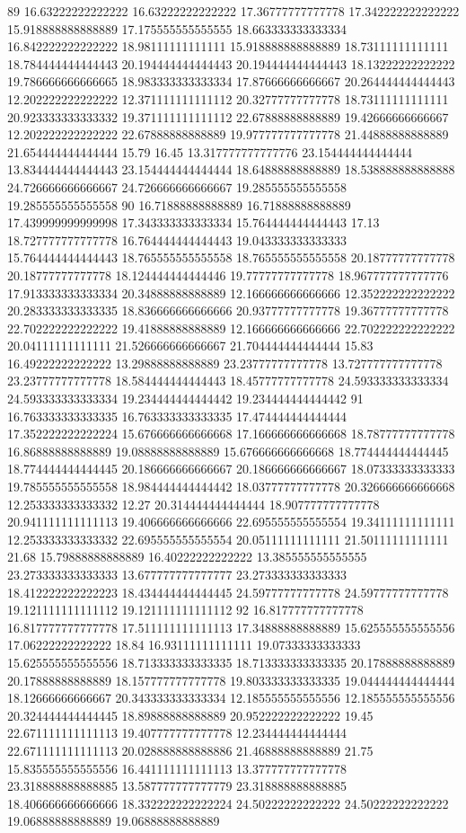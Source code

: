 89 16.63222222222222 16.63222222222222 17.36777777777778 17.342222222222222 15.918888888888889 17.175555555555555 18.663333333333334 16.842222222222222 18.98111111111111 15.918888888888889 18.73111111111111 18.784444444444443 20.194444444444443 20.194444444444443 18.13222222222222 19.786666666666665 18.983333333333334 17.87666666666667 20.264444444444443 12.202222222222222 12.371111111111112 20.32777777777778 18.73111111111111 20.923333333333332 19.371111111111112 22.67888888888889 19.42666666666667 12.202222222222222 22.67888888888889 19.977777777777778 21.44888888888889 21.654444444444444 15.79 16.45 13.317777777777776 23.154444444444444 13.834444444444443 23.154444444444444 18.64888888888889 18.538888888888888 24.726666666666667 24.726666666666667 19.285555555555558 19.285555555555558
90 16.71888888888889 16.71888888888889 17.439999999999998 17.343333333333334 15.764444444444443 17.13 18.727777777777778 16.764444444444443 19.043333333333333 15.764444444444443 18.765555555555558 18.765555555555558 20.18777777777778 20.18777777777778 18.124444444444446 19.77777777777778 18.967777777777776 17.913333333333334 20.34888888888889 12.166666666666666 12.352222222222222 20.283333333333335 18.836666666666666 20.93777777777778 19.36777777777778 22.702222222222222 19.41888888888889 12.166666666666666 22.702222222222222 20.04111111111111 21.526666666666667 21.704444444444444 15.83 16.49222222222222 13.29888888888889 23.23777777777778 13.727777777777778 23.23777777777778 18.584444444444443 18.45777777777778 24.593333333333334 24.593333333333334 19.234444444444442 19.234444444444442
91 16.763333333333335 16.763333333333335 17.474444444444444 17.352222222222224 15.676666666666668 17.166666666666668 18.78777777777778 16.86888888888889 19.08888888888889 15.676666666666668 18.774444444444445 18.774444444444445 20.186666666666667 20.186666666666667 18.07333333333333 19.785555555555558 18.984444444444442 18.03777777777778 20.326666666666668 12.253333333333332 12.27 20.314444444444444 18.907777777777778 20.941111111111113 19.406666666666666 22.695555555555554 19.34111111111111 12.253333333333332 22.695555555555554 20.05111111111111 21.50111111111111 21.68 15.79888888888889 16.40222222222222 13.385555555555555 23.273333333333333 13.677777777777777 23.273333333333333 18.412222222222223 18.434444444444445 24.59777777777778 24.59777777777778 19.121111111111112 19.121111111111112
92 16.817777777777778 16.817777777777778 17.511111111111113 17.34888888888889 15.625555555555556 17.06222222222222 18.84 16.93111111111111 19.07333333333333 15.625555555555556 18.713333333333335 18.713333333333335 20.17888888888889 20.17888888888889 18.157777777777778 19.803333333333335 19.044444444444444 18.12666666666667 20.343333333333334 12.185555555555556 12.185555555555556 20.324444444444445 18.89888888888889 20.952222222222222 19.45 22.671111111111113 19.407777777777778 12.234444444444444 22.671111111111113 20.028888888888886 21.46888888888889 21.75 15.835555555555556 16.441111111111113 13.377777777777778 23.318888888888885 13.587777777777779 23.318888888888885 18.406666666666666 18.332222222222224 24.50222222222222 24.50222222222222 19.06888888888889 19.06888888888889
